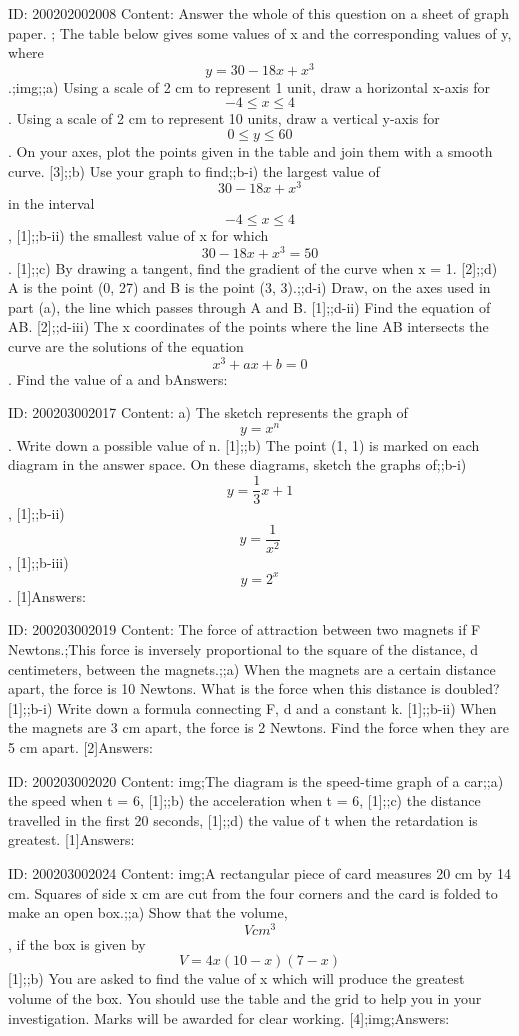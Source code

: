 \documentclass{article}
\begin{document}
ID: 200202002008
Content:
Answer the whole of this question on a sheet of graph paper. ; The table below gives some values of x and the corresponding values of y, where $$y=30-18x+x^{3} $$.;img;;a) Using a scale of 2 cm to represent 1 unit, draw a horizontal x-axis for $$-4\leq x\leq4$$. Using a scale of 2 cm to represent 10 units, draw a vertical y-axis for $$0\leq y\leq 60$$. On your axes, plot the points given in the table and join them with a smooth curve. [3];;b) Use your graph to find;;b-i) the largest value of  $$30-18x+x^{3}$$ in the interval $$-4\leq x\leq 4$$, [1];;b-ii) the smallest value of x for which $$30-18x+x^{3} =50$$. [1];;c) By drawing a tangent, find the gradient of the curve when x = 1. [2];;d) A is the point (0, 27) and B is the point (3, 3).;;d-i) Draw, on the axes used in part (a), the line which passes through A and B. [1];;d-ii) Find the equation of AB. [2];;d-iii) The x coordinates of the points where the line AB intersects the curve are the solutions of the equation $$x^{3} +ax+b=0$$. Find the value of a and bAnswers:

ID: 200203002017
Content:
a) The sketch represents the graph of $$y = x^n$$. Write down a possible value of n.   [1];;b) The point (1, 1) is marked on each diagram in the answer space. On these diagrams, sketch the graphs of;;b-i) $$y = \frac{1}{3}x + 1$$,   [1];;b-ii) $$y = \frac{1}{x^2}$$,   [1];;b-iii) $$y = 2^x$$.   [1]Answers:

ID: 200203002019
Content:
The force of attraction between two magnets if F Newtons.;This force is inversely proportional to the square of the distance, d centimeters, between the magnets.;;a) When the magnets are a certain distance apart, the force is 10 Newtons. What is the force when this distance is doubled?   [1];;b-i) Write down a formula connecting F, d and a constant k.   [1];;b-ii) When the magnets are 3 cm apart, the force is 2 Newtons. Find the force when they are 5 cm apart.   [2]Answers:

ID: 200203002020
Content:
img;The diagram is the speed-time graph of a car;;a) the speed when t = 6,   [1];;b) the acceleration when t = 6,   [1];;c) the distance travelled in the first 20 seconds,   [1];;d) the value of t when the retardation is greatest.   [1]Answers:

ID: 200203002024
Content:
img;A rectangular piece of card measures 20 cm by 14 cm. Squares of side x cm are cut from the four corners and the card is folded to make an open box.;;a) Show that the volume, $$V cm^3$$, if the box is given by $$V = 4x(10 - x)(7 - x)$$ [1];;b) You are asked to find the value of x which will produce the greatest volume of the box. You should use the table and the grid to help you in your investigation. Marks will be awarded for clear working.   [4];img;Answers:
\end{document}
